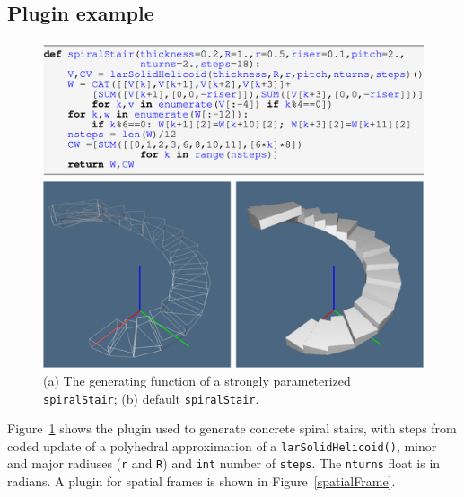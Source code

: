 \subsection{Plugin example}

\begin{figure}[t] %
   \centering
   \includegraphics[width=\linewidth]{images/spiralstair}
   
   \includegraphics[width=\linewidth]{images/spiralstair2}
   \caption{(a) The generating function of a strongly parameterized \texttt{spiralStair}; (b) default \texttt{spiralStair}.}
   \label{spiralstair}
\end{figure}

\noindent
Figure~\ref{spiralstair} shows the plugin used to generate concrete spiral stairs, with steps from coded update of a polyhedral approximation of a \texttt{larSolidHelicoid()},  minor and major radiuses (\texttt{r} and \texttt{R}) and \texttt{int} number of \texttt{steps}. The \texttt{nturns} float is in radians. A plugin for spatial frames is shown in Figure~\ref{spatialFrame}.


